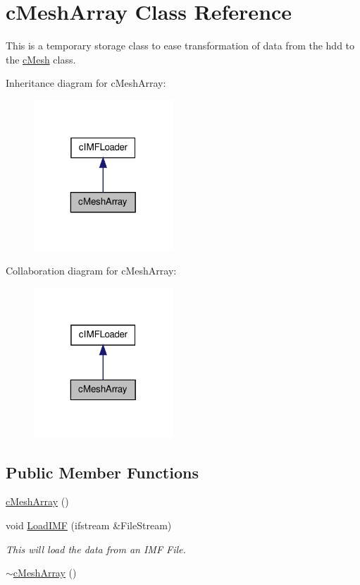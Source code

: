 \hypertarget{classc_mesh_array}{
\section{cMeshArray Class Reference}
\label{classc_mesh_array}
}


This is a temporary storage class to ease transformation of data from the hdd to the \hyperlink{classc_mesh}{cMesh} class.  




Inheritance diagram for cMeshArray:
\nopagebreak
\begin{figure}[H]
\begin{center}
\leavevmode
\includegraphics[width=148pt]{classc_mesh_array__inherit__graph}
\end{center}
\end{figure}


Collaboration diagram for cMeshArray:
\nopagebreak
\begin{figure}[H]
\begin{center}
\leavevmode
\includegraphics[width=148pt]{classc_mesh_array__coll__graph}
\end{center}
\end{figure}
\subsection*{Public Member Functions}
\begin{DoxyCompactItemize}
\item 
\hyperlink{classc_mesh_array_a7f8a0a0053d2a91d5c91bed80ec745ee}{cMeshArray} ()
\item 
void \hyperlink{classc_mesh_array_adce4a1c4b77569227f23d1e4cc46b4bb}{LoadIMF} (ifstream \&FileStream)
\begin{DoxyCompactList}\small\item\em This will load the data from an IMF File. \item\end{DoxyCompactList}\item 
\hyperlink{classc_mesh_array_a142887dc3853e28068cd0ad89aed926c}{$\sim$cMeshArray} ()
\end{DoxyCompactItemize}

